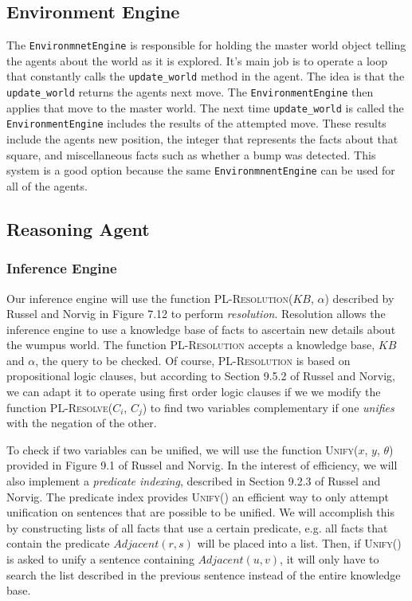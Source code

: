 \documentclass{article}
\begin{document}
		\subsection{Environment Engine}
		The \texttt{EnvironmnetEngine} is responsible for holding the master world object telling the agents about the world as it is explored.
		It's main job is to operate a loop that constantly calls the \texttt{update\_world} method in the agent. 
		The idea is that the \texttt{update\_world} returns the agents next move. 
		The \texttt{EnvironmentEngine} then applies that move to the master world.
		The next time \texttt{update\_world} is called the \texttt{EnvironmentEngine} includes the results of the attempted move.
		These results include the agents new position, the integer that represents the facts about that square, and miscellaneous facts such as whether a bump was detected. 
		This system is a good option because the same \texttt{EnvironmnentEngine} can be used for all of the agents. 
		\subsection{Reasoning Agent}
		\label{reason}
		
			\subsubsection{Inference Engine}
			
				Our inference engine will use the function \textsc{PL-Resolution}($KB$, $\alpha$) described by Russel and Norvig in Figure 7.12 \cite{ai} to perform \textit{resolution}. 
				Resolution allows the inference engine to use a knowledge base of facts to ascertain new details about the wumpus world. 
				The function \textsc{PL-Resolution} accepts a knowledge base, $KB$ and $\alpha$, the query to be checked. Of course, \textsc{PL-Resolution} is based on propositional logic clauses, but according to Section 9.5.2 of Russel and Norvig, we can adapt it to operate using first order logic clauses if we we modify the function \textsc{PL-Resolve($C_i$, $C_j$)} to find two variables complementary if one \textit{unifies} with the negation of the other. 
				
				To check if two variables can be unified, we will use the function \textsc{Unify}($x$, $y$, $\theta$) provided in Figure 9.1 of Russel and Norvig.
				In the interest of efficiency, we will also implement a \textit{predicate indexing}, described in Section 9.2.3 of Russel and Norvig\cite{ai}.
				The predicate index provides \textsc{Unify}() an efficient way to only attempt unification on sentences that are possible to be unified. 
				We will accomplish this by constructing lists of all facts that use a certain predicate, e.g. all facts that contain the predicate $Adjacent(r,s)$ will be placed into a list.
				Then, if \textsc{Unify()} is asked to unify a sentence containing $Adjacent(u,v)$, it will only have to search the list described in the previous sentence instead of the entire knowledge base.
				
\end{document}
